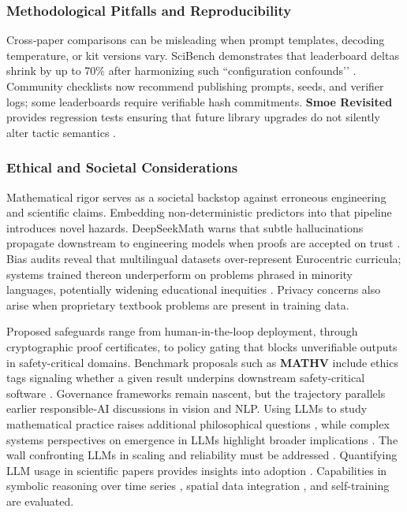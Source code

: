\documentclass[acmsmall,anonymous]{acmart}
\begin{document}
\subsubsection{Methodological Pitfalls and Reproducibility}\label{sec:method}
Cross‐paper comparisons can be misleading when prompt templates, decoding temperature, or kit versions vary. SciBench demonstrates that leaderboard deltas shrink by up to 70\% after harmonizing such “configuration confounds’’ \cite{chen2024scibench}.  Community checklists now recommend publishing prompts, seeds, and verifier logs; some leaderboards require verifiable hash commitments.  \textbf{Smoe Revisited} provides regression tests ensuring that future library upgrades do not silently alter tactic semantics \cite{williams2024smoerevisited}.

\subsubsection{Ethical and Societal Considerations}\label{sec:ethics}
Mathematical rigor serves as a societal backstop against erroneous engineering and scientific claims.  Embedding non-deterministic predictors into that pipeline introduces novel hazards. DeepSeekMath warns that subtle hallucinations propagate downstream to engineering models when proofs are accepted on trust \cite{shao2024deepseekmath}.  Bias audits reveal that multilingual datasets over-represent Eurocentric curricula; systems trained thereon underperform on problems phrased in minority languages, potentially widening educational inequities \cite{li2024xwinmath}.  Privacy concerns also arise when proprietary textbook problems are present in training data.

Proposed safeguards range from human-in-the-loop deployment, through cryptographic proof certificates, to policy gating that blocks unverifiable outputs in safety-critical domains.  Benchmark proposals such as \textbf{MATHV} include ethics tags signaling whether a given result underpins downstream safety-critical software \cite{wang2024mathv}.  Governance frameworks remain nascent, but the trajectory parallels earlier responsible‐AI discussions in vision and NLP. Using LLMs to study mathematical practice raises additional philosophical questions \cite{dalessandro2025usingllmmathpractice,anonymous2025usingllmmathpractice}, while complex systems perspectives on emergence in LLMs highlight broader implications \cite{mitchell2025largescaleemergence,anonymous2025largescaleemergence}. The wall confronting LLMs in scaling and reliability must be addressed \cite{coveney2025wall,anonymous2025wall}. Quantifying LLM usage in scientific papers provides insights into adoption \cite{liang2025quantifying}. Capabilities in symbolic reasoning over time series \cite{liu2025can}, spatial data integration \cite{han2025can}, and self-training \cite{shafayat2025can} are evaluated.
\end{document}
